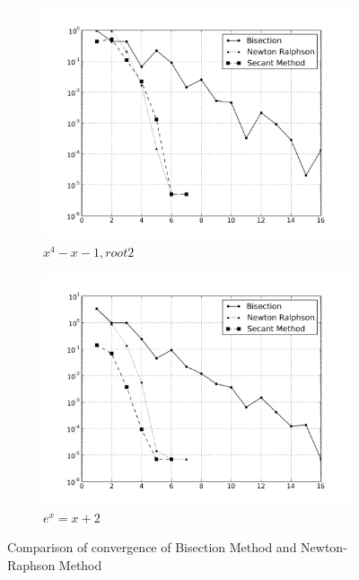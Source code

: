 \documentclass[12,a4paper]{article}
\begin{document}
\begin{figure}
\begin{subfigure}[b]{0.49\textwidth}
            \includegraphics[width=\textwidth]{plots/root9.png}
            \caption{$x^4-x-1, root 2$}
            \label{fig:root9}
        \end{subfigure}
        \begin{subfigure}[b]{0.49\textwidth}
            \includegraphics[width=\textwidth]{plots/root10.png}
            \caption{$e^x=x+2$}
            \label{fig:root10}
        \end{subfigure}
        \caption{Comparison of convergence of Bisection Method and Newton-Raphson Method}
    \end{figure}
\end{document}
